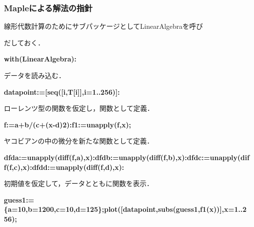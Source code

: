 \documentclass{article}
\begin{document}
\subsubsection{\textbf{Mapleによる解法の指針}}
\begin{maplegroup}
\begin{Maple Normal}{
線形代数計算のためにサブパッケージとしてLinearAlgebraを呼び}\end{Maple Normal}

\begin{Maple Normal}{
だしておく．}\end{Maple Normal}

\textbf{with(LinearAlgebra):}\end{maplegroup}
\begin{maplegroup}
\begin{Maple Normal}{
データを読み込む．}\end{Maple Normal}

\textbf{datapoint:=[seq([i,T[i]],i=1..256)]:}\end{maplegroup}
\begin{maplegroup}
\begin{Maple Normal}{
ローレンツ型の関数を仮定し，関数として定義．}\end{Maple Normal}

\textbf{f:=a+b/(c+(x-d)2):}\textbf{f1:=unapply(f,x);}\mapleresult
\begin{maplelatex}
\end{maplelatex}
\end{maplegroup}
\begin{maplegroup}
\begin{Maple Normal}{
ヤコビアンの中の微分を新たな関数として定義．}\end{Maple Normal}

\textbf{dfda:=unapply(diff(f,a),x):}\textbf{dfdb:=unapply(diff(f,b),x):}\textbf{dfdc:=unapply(diff(f,c),x):}\textbf{dfdd:=unapply(diff(f,d),x):}\end{maplegroup}
\begin{maplegroup}
\begin{Maple Normal}{
初期値を仮定して，データとともに関数を表示．}\end{Maple Normal}

\textbf{guess1:=\{a=10,b=1200,c=10,d=125\};}\textbf{plot([datapoint,subs(guess1,f1(x))],x=1..256);}\mapleresult
\begin{maplelatex}
\end{maplelatex}
\mapleresult
{}
\end{maplegroup}
\end{document}
